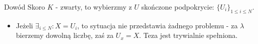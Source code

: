 \documentclass{article}
\numberwithin{defi}{section}
\numberwithin{defi}{section}
\newcommand{\se}{\subseteq}
\renewcommand{\leq}{\leqslant}
\newcommand{\ball}[2]{\text{Ball}(#1, \, #2)}
\begin{document}
\begin{dow}{Dowód}
    Skoro $K$ - zwarty, to wybierzmy z $U$ skończone podpokrycie: $\{U_i\}_{1 \leq i \leq N}$. 
    \begin{itemize}
        \item Jeżeli $\exists_{i\leq N}: X = U_i$, to sytuacja nie przedstawia żadnego problemu - za $\lambda$ bierzemy dowolną liczbę, zaś za $U_x = X$. Teza jest trywialnie spełniona.


        

\end{itemize}
\end{dow}
\end{document}
